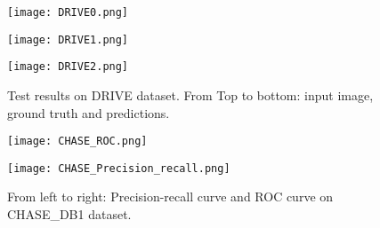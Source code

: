 \documentclass{article}
\begin{document}
\begin{figure}[!htb]
    \centering
    \begin{minipage}{0.14\textwidth}
        \centering
        \texttt{[image: DRIVE0.png]}
    \end{minipage}\begin{minipage}{0.14\textwidth}
        \centering
        \texttt{[image: DRIVE1.png]}
    \end{minipage}\begin{minipage}{0.14\textwidth}
        \centering
        \texttt{[image: DRIVE2.png]}
    \end{minipage}\caption{
    \footnotesize{Test results on DRIVE dataset. From Top to bottom: input image, ground truth and predictions.}
    }
    \label{DRIVEImage}
\end{figure} 


\begin{figure}[!htb]
    \centering
    \begin{minipage}{.25\textwidth}
        \centering
        \texttt{[image: CHASE\_ROC.png]}
    \end{minipage}\begin{minipage}{0.25\textwidth}
        \centering
        \texttt{[image: CHASE\_Precision\_recall.png]}
    \end{minipage}
    \caption{
    \footnotesize{From left to right: Precision-recall curve and ROC curve on CHASE\_DB1 dataset.}
    }
    \label{CHASEROC}
\end{figure} 
\end{document}
